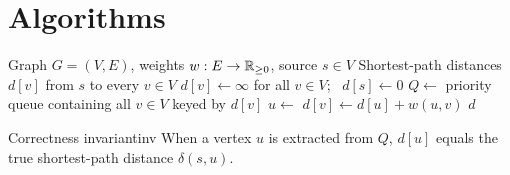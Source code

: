 \section{Algorithms}

\begin{algorithm}[t]
\caption{Dijkstra's shortest paths}\label{alg:dijkstra}
\begin{algorithmic}[1]
\Require Graph $G=(V,E)$, weights $w:E\to\mathbb{R}_{\ge 0}$, source $s\in V$
\Ensure Shortest-path distances $d[v]$ from $s$ to every $v\in V$
\State $d[v]\gets\infty$ for all $v\in V$; \ $d[s]\gets 0$
\State $Q\gets$ priority queue containing all $v\in V$ keyed by $d[v]$
  \State $u\gets$ 
      \State $d[v]\gets d[u]+w(u,v)$
      \State {}
    \EndIf
  \EndFor
\EndWhile
\State \Return $d$
\end{algorithmic}
\end{algorithm}

\begin{lemma}{Correctness invariant}{inv}
When a vertex $u$ is extracted from $Q$, $d[u]$ equals the true shortest-path
distance $\delta(s,u)$.
\end{lemma}

